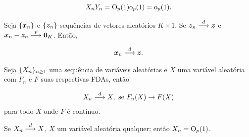 \documentclass[11pt, oneside, a4paper, article]{article}
\numberwithin{equation}{section}
\begin{document}
\begin{description}
\begin{lem}
	\vspace{-1 em}
	\begin{align*}
		X_{n} Y_{n} = \text{O}_{p}(1) \text{o}_{p}(1) = \text{o}_{p}(1).
	\end{align*}
\end{lem}

\begin{lem} \label{lem:equiv:assin}
	\citet[Lemma 3.7, p.39]{wool-2010}

	Seja
	$\{\boldsymbol{x}_{n}\}$ e $\{\boldsymbol{z}_{n}\}$
	sequências de vetores aleatórios $K \times 1$.
	Se $\boldsymbol{z}_{n}  \overset{d}{\longrightarrow}  \boldsymbol{z}$ e 
	$\boldsymbol{x}_{n} - \boldsymbol{z}_{n}  \overset{p}{\longrightarrow}  \boldsymbol{0}_{K}$.
	Então, 

	\vspace{-1 em}
	\begin{align*}
		\boldsymbol{x}_{n}  \overset{d}{\longrightarrow}  \boldsymbol{z}.
	\end{align*}

\end{lem}

\begin{defn}
	\citet[Def 3.6, p.38]{wool-2010}

	Seja
	$\{X_{n}\}_{n \geq 1}$  uma sequência de variáveis aleatórias e $X$ uma variável aleatória com $F_{n}$ e $F$ suas respectivas FDAs, então

	\vspace{-1 em}
	\begin{align*}
		X_{n}  \overset{d}{\longrightarrow}  X, \text{ se } F_{n}(X) \to F(X)
	\end{align*}
	\noindent
	para todo $X$ onde $F$ é contínuo.
\end{defn}

\begin{lem}
	\citet[Lemma 3.5, p.39]{wool-2010}

	Se $X_{n}  \overset{d}{\longrightarrow}  X$, $X$ um variável aleatória qualquer; então $X_{n} = \text{O}_{p}(1)$.
\end{lem}

\begin{defn} \label{def:tcl}


\end{defn}
\end{description}
\end{document}

